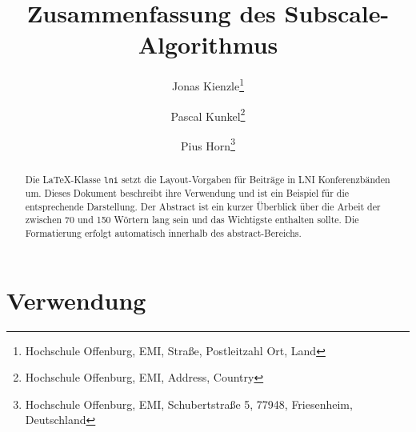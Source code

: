 \documentclass[utf8,biblatex]{lni}
\begin{document}
\title[Subscale]{Zusammenfassung des Subscale-Algorithmus}
\author[Jonas Kienzle, Pascal Kunkel \and Pius Horn]
{Jonas Kienzle\footnote{Hochschule Offenburg, EMI, Straße, Postleitzahl Ort, Land } \and
 Pascal Kunkel\footnote{Hochschule Offenburg, EMI, Address, Country } \and
Pius Horn\footnote{Hochschule Offenburg, EMI, Schubertstraße 5, 77948, Friesenheim, Deutschland }}
\maketitle

\begin{abstract}
Die \LaTeX-Klasse \texttt{lni} setzt die Layout-Vorgaben für Beiträge in LNI Konferenzbänden um.
Dieses Dokument beschreibt ihre Verwendung und ist ein Beispiel für die entsprechende Darstellung.
Der Abstract ist ein kurzer Überblick über die Arbeit der zwischen 70 und 150 Wörtern lang sein und das Wichtigste enthalten sollte.
Die Formatierung erfolgt automatisch innerhalb des abstract-Bereichs.
\end{abstract}


\section{Verwendung}



\printbibliography
\end{document}

